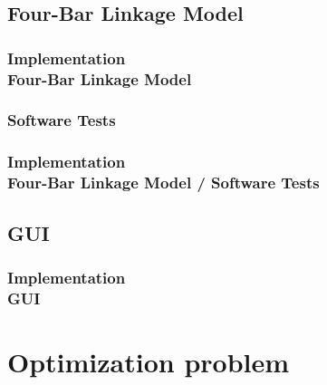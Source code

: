 \documentclass[ucs,10pt]{beamer}
\begin{document}
\subsection{Four-Bar Linkage Model}

\begin{frame}
\frametitle{Implementation \\
	\small \color{rwth-blue} Four-Bar Linkage Model}
\end{frame}

\subsubsection{Software Tests}

\begin{frame}
	\frametitle{Implementation \\
		\small \color{rwth-blue} Four-Bar Linkage Model / Software Tests}
\end{frame}

\subsection{GUI}

\begin{frame}
\frametitle{Implementation \\
	\small \color{rwth-blue} GUI}
\end{frame}

\section{Optimization problem}
\end{document}
